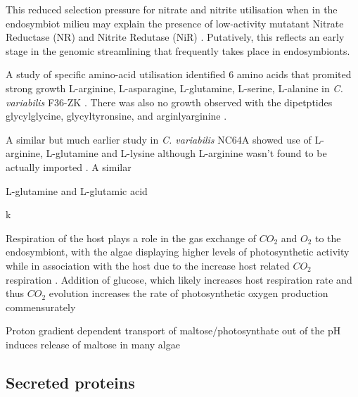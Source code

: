 This reduced selection pressure for nitrate and nitrite utilisation when in the endosymbiot
milieu may explain the presence of low-activity mutatant Nitrate Reductase (NR) and Nitrite
Redutase (NiR) \citep{Kato2009}. 
Putatively, this reflects an early stage in the genomic streamlining that frequently
takes place in endosymbionts. 


A study of specific amino-acid utilisation identified
6 amino acids that promited strong growth L-arginine, L-asparagine,
L-glutamine, L-serine, L-alanine in \textit{C. variabilis} F36-ZK \citep{Kato2006}.
There was also no growth observed with the dipetptides
glycylglycine, glycyltyronsine, and arginlyarginine \citep{Kato2006}.

A similar but much earlier study in \textit{C. variabilis} NC64A
showed use of L-arginine, L-glutamine and L-lysine although L-arginine wasn't
found to be actually imported \citep{McAuley1986}.  A similar




L-glutamine and L-glutamic acid

k






 Respiration of the host plays a role in the gas exchange of \(CO_2\) and \(O_2\) 
 to the endosymbiont, with the algae displaying higher levels of photosynthetic
 activity while in association with the host due to the increase host related 
 \(CO_2\) respiration \citep{Reisser1980}.
Addition of glucose, which likely increases host respiration rate and thus \(CO_2\)
evolution increases the rate of photosynthetic oxygen production commensurately \citep{Reisser1980}




Proton gradient dependent transport of maltose/photosynthate out of the \citep{Schussler1992}
pH induces release of maltose in many algae \citep{}

%


\subsection{Secreted proteins}

